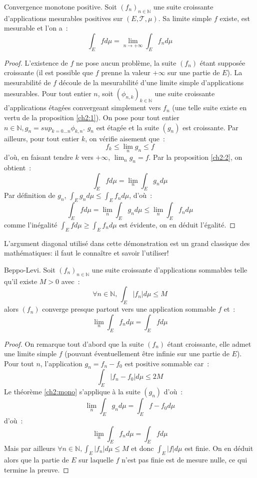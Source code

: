 \begin{mandatory}
\begin{theorem}\label{ch2:mono} Convergence monotone positive. Soit $(f_n)_{n \in \mathbb{N}}$ une suite croissante d'applications
mesurables positives sur $(E, \mathcal{T}, \mu)$. 
Sa limite simple $f$ existe, est mesurable et
l'on a~:
\[
\int_E f d \mu = \lim_{n \to +\infty} \int_E f_n d \mu
\]
\end{theorem}
\end{mandatory}
\begin{proof}
L'existence de $f$ ne pose aucun problème, la suite $(f_n)$ étant
supposée croissante (il est possible que $f$ prenne la valeur
$+\infty$ sur une partie de $E$). La mesurabilité de $f$ découle de la
mesurabilité d'une limite simple d'applications mesurables. 
Pour tout entier $n$, soit $(\phi_{n,k})_{k \in \mathbb{N}}$ une
suite croissante d'applications étagées convergeant simplement vers
$f_n$ (une telle suite existe en vertu de la proposition
\ref{ch2:1}). On pose pour tout entier $n \in \mathbb{N}, g_n =
sup_{k=0 \dots n} \phi_{k,n}$. $g_n$ est étagée et la suite $(g_n)$
est croissante. Par ailleurs, pour tout entier $k$, on vérifie
aisement que~:
\[
f_k \leq \lim_n g_n \leq f
\]
d'où, en faisant tendre $k$ vers $+\infty$, $\lim_n g_n = f$. Par la
proposition \ref{ch2:2}, on obtient~:
\[
\int_E f d \mu =  \lim_n \int_E g_n d \mu
\]
Par définition de $g_n$, $\int_E g_n d \mu \leq \int_E f_n d \mu$, d'où~:
\[
\int_E f d \mu = \lim_n \int_E g_n d \mu \leq \lim_n \int_E f_n d \mu
\]
comme l'inégalité $\int_E f d \mu \geq \int_E f_n d \mu$ est évidente,
on en déduit l'égalité.
\end{proof}
\begin{rem}
L'argument diagonal utilisé dans cette démonstration est un grand classique des
mathématiques: il faut le connaître et savoir l'utiliser!
\end{rem}
\begin{mandatory}
\begin{theorem}\label{ch2:beppo} Beppo-Levi.
Soit $(f_n)_{n \in \mathbb{N}}$ une suite croissante d'applications
sommables telle qu'il existe $M >0$ avec~:
\[
\forall n \in \mathbb{N}, \, \int_E |f_n|d \mu \leq M
\] 
alors $(f_n)$ converge presque partout vers une application sommable
$f$ et~:
\[
\lim_n \int_E f_n d \mu = \int_E f d\mu
\]
\end{theorem}
\end{mandatory}
\begin{proof}
On remarque tout d'abord que la suite $(f_n)$ étant croissante, elle
admet une limite simple $f$ (pouvant éventuellement être infinie sur
une partie de $E$).
Pour tout $n$, l'application $g_n = f_n -f_0$ est positive sommable car~:
\[
\int_E |f_n - f_0| d \mu \leq 2 M
\]
Le théorème \ref{ch2:mono} s'applique à la suite $(g_n)$ d'où~:
\[
\lim_n \int_E g_n d \mu = \int_E f - f_0 d \mu
\]
d'où~:
\[
\lim_n \int_E f_n d \mu = \int_E f d \mu
\]
Mais par ailleurs $\forall n \in \mathbb{N}, \int_E |f_n| d \mu \leq
M$ et donc $\int_E |f| d \mu$ est finie. On en déduit alors que la
partie de $E$ sur laquelle $f$ n'est pas finie est de mesure nulle, ce
qui termine la preuve.
\end{proof}
